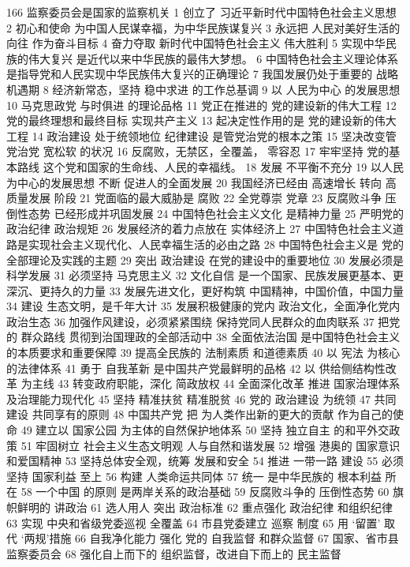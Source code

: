 \documentclass[cyan]{elegantnote}
\begin{document}
166 监察委员会是国家的监察机关
1 创立了 习近平新时代中国特色社会主义思想
2 初心和使命
为中国人民谋幸福，为中华民族谋复兴
3 永远把 人民对美好生活的向往 作为奋斗目标
4 奋力夺取 新时代中国特色社会主义 伟大胜利
5 实现中华民族的伟大复兴 是近代以来中华民族的最伟大梦想。
6 中国特色社会主义理论体系
是指导党和人民实现中华民族伟大复兴的正确理论
7 我国发展仍处于重要的 战略机遇期
8 经济新常态，坚持 稳中求进 的工作总基调
9 以 人民为中心 的发展思想
10 马克思政党 与时俱进 的理论品格
11 党正在推进的 党的建设新的伟大工程
12 党的最终理想和最终目标
实现共产主义
13 起决定性作用的是
党的建设新的伟大工程
14 政治建设 处于统领地位
纪律建设 是管党治党的根本之策
15 坚决改变管党治党 宽松软 的状况
16 反腐败，无禁区，全覆盖， 零容忍
17 牢牢坚持 党的基本路线 这个党和国家的生命线、人民的幸福线。
18 发展 不平衡不充分
19 以人民为中心的发展思想
不断 促进人的全面发展
20 我国经济已经由
高速增长 转向 高质量发展 阶段
21 党面临的最大威胁是 腐败
22 全党尊崇 党章
23 反腐败斗争 压倒性态势 已经形成并巩固发展
24 中国特色社会主义文化 是精神力量
25 严明党的 政治纪律 政治规矩
26 发展经济的着力点放在 实体经济上
27 中国特色社会主义道路是实现社会主义现代化、人民幸福生活的必由之路
28 中国特色社会主义是 党的全部理论及实践的主题
29 突出 政治建设 在党的建设中的重要地位
30 发展必须是 科学发展
31 必须坚持 马克思主义
32 文化自信 是一个国家、民族发展更基本、更深沉、更持久的力量
33 发展先进文化，更好构筑 中国精神，中国价值，中国力量
34 建设 生态文明，是千年大计
35 发展积极健康的党内 政治文化，全面净化党内 政治生态
36 加强作风建设，必须紧紧围绕 保持党同人民群众的血肉联系
37 把党的 群众路线 贯彻到治国理政的全部活动中
38 全面依法治国 是中国特色社会主义的本质要求和重要保障
39 提高全民族的 法制素质 和道德素质
40 以 宪法 为核心的法律体系
41 勇于 自我革新 是中国共产党最鲜明的品格
42 以 供给侧结构性改革 为主线
43 转变政府职能，深化 简政放权
44 全面深化改革 推进 国家治理体系及治理能力现代化
45 坚持 精准扶贫 精准脱贫
46 党的 政治建设 为统领
47 共同建设 共同享有的原则
48 中国共产党 把 为人类作出新的更大的贡献 作为自己的使命
49 建立以 国家公园 为主体的自然保护地体系
50 坚持 独立自主 的和平外交政策
51 牢固树立 社会主义生态文明观 人与自然和谐发展
52 增强 港奥的 国家意识 和爱国精神
53 坚持总体安全观，统筹 发展和安全
54 推进 一带一路 建设
55 必须坚持 国家利益 至上
56 构建 人类命运共同体
57 统一 是中华民族的 根本利益 所在
58 一个中国 的原则 是两岸关系的政治基础
59 反腐败斗争的 压倒性态势
60 旗帜鲜明的 讲政治
61 选人用人 突出 政治标准
62 重点强化 政治纪律 和组织纪律
63 实现 中央和省级党委巡视 全覆盖
64 市县党委建立 巡察 制度
65 用 ‘留置’ 取代 ‘两规’措施
66 自我净化能力 强化 党的 自我监督 和群众监督
67 国家、省市县 监察委员会
68 强化自上而下的 组织监督，改进自下而上的 民主监督
\end{document}
